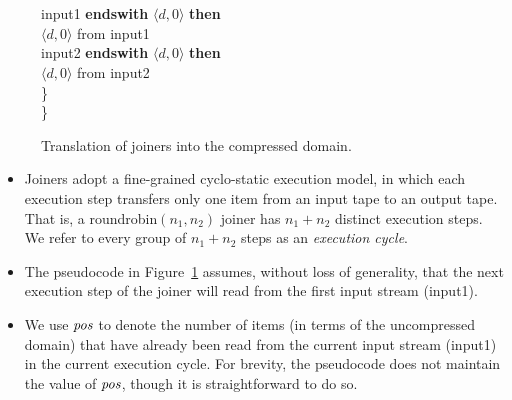 \begin{figure}[t!]
\begin{minipage}{0.75\textwidth}
\tab\tab\\
\tab{}\\
\tab{} input1 {\bf endswith} $\langle d, 0 \rangle$ {\bf then}\\
\tab\tab{} $\langle d,0 \rangle$ from input1\\
\tab{} input2 {\bf endswith} $\langle d, 0 \rangle$ {\bf then}\\
\tab\tab{} $\langle d,0 \rangle$ from input2\\
\tab\}\\
\}
\end{minipage}
\caption[Translation of joiners into the compressed
  domain]{Translation of joiners into the compressed domain.
\protect\label{fig:translate-joiner}}
\end{figure}

\begin{itemize}

\item Joiners adopt a fine-grained cyclo-static
  execution model, in which each execution step transfers only one
  item from an input tape to an output tape.  That is, a
  roundrobin$(n_1, n_2)$ joiner has $n_1 + n_2$ distinct execution
  steps.  We refer to every group of $n_1 + n_2$ steps as an {\it
  execution cycle}.

\item The pseudocode in Figure~\ref{fig:translate-joiner} assumes,
  without loss of generality, that the next execution step of the
  joiner will read from the first input stream (input1).

\item We use $\mbox{\it pos}$ to denote the number of items (in terms of the
  uncompressed domain) that have already been read from the current
  input stream (input1) in the current execution cycle.  For brevity,
  the pseudocode does not maintain the value of $\mbox{\it pos}$, though it is
  straightforward to do so.

\end{itemize}

